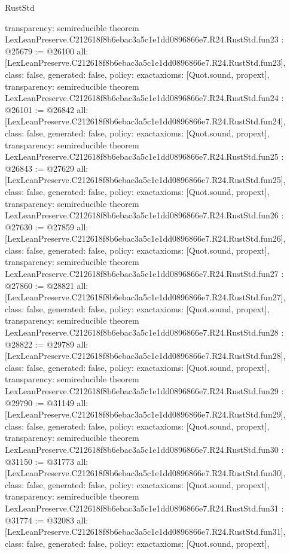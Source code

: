 \begin{lexlean}{RustStd}
\begin{coremodule}
{  transparency: semireducible
}
theorem LexLeanPreserve.C212618f8b6ebac3a5c1e1dd0896866e7.R24.RustStd.fun23 : @25679 := @26100 {
  all: [LexLeanPreserve.C212618f8b6ebac3a5c1e1dd0896866e7.R24.RustStd.fun23],
  class: false,
  generated: false,
  policy: exact{axioms: [Quot.sound, propext]},
  transparency: semireducible
}
theorem LexLeanPreserve.C212618f8b6ebac3a5c1e1dd0896866e7.R24.RustStd.fun24 : @26101 := @26842 {
  all: [LexLeanPreserve.C212618f8b6ebac3a5c1e1dd0896866e7.R24.RustStd.fun24],
  class: false,
  generated: false,
  policy: exact{axioms: [Quot.sound, propext]},
  transparency: semireducible
}
theorem LexLeanPreserve.C212618f8b6ebac3a5c1e1dd0896866e7.R24.RustStd.fun25 : @26843 := @27629 {
  all: [LexLeanPreserve.C212618f8b6ebac3a5c1e1dd0896866e7.R24.RustStd.fun25],
  class: false,
  generated: false,
  policy: exact{axioms: [Quot.sound, propext]},
  transparency: semireducible
}
theorem LexLeanPreserve.C212618f8b6ebac3a5c1e1dd0896866e7.R24.RustStd.fun26 : @27630 := @27859 {
  all: [LexLeanPreserve.C212618f8b6ebac3a5c1e1dd0896866e7.R24.RustStd.fun26],
  class: false,
  generated: false,
  policy: exact{axioms: [Quot.sound, propext]},
  transparency: semireducible
}
theorem LexLeanPreserve.C212618f8b6ebac3a5c1e1dd0896866e7.R24.RustStd.fun27 : @27860 := @28821 {
  all: [LexLeanPreserve.C212618f8b6ebac3a5c1e1dd0896866e7.R24.RustStd.fun27],
  class: false,
  generated: false,
  policy: exact{axioms: [Quot.sound, propext]},
  transparency: semireducible
}
theorem LexLeanPreserve.C212618f8b6ebac3a5c1e1dd0896866e7.R24.RustStd.fun28 : @28822 := @29789 {
  all: [LexLeanPreserve.C212618f8b6ebac3a5c1e1dd0896866e7.R24.RustStd.fun28],
  class: false,
  generated: false,
  policy: exact{axioms: [Quot.sound, propext]},
  transparency: semireducible
}
theorem LexLeanPreserve.C212618f8b6ebac3a5c1e1dd0896866e7.R24.RustStd.fun29 : @29790 := @31149 {
  all: [LexLeanPreserve.C212618f8b6ebac3a5c1e1dd0896866e7.R24.RustStd.fun29],
  class: false,
  generated: false,
  policy: exact{axioms: [Quot.sound, propext]},
  transparency: semireducible
}
theorem LexLeanPreserve.C212618f8b6ebac3a5c1e1dd0896866e7.R24.RustStd.fun30 : @31150 := @31773 {
  all: [LexLeanPreserve.C212618f8b6ebac3a5c1e1dd0896866e7.R24.RustStd.fun30],
  class: false,
  generated: false,
  policy: exact{axioms: [Quot.sound, propext]},
  transparency: semireducible
}
theorem LexLeanPreserve.C212618f8b6ebac3a5c1e1dd0896866e7.R24.RustStd.fun31 : @31774 := @32083 {
  all: [LexLeanPreserve.C212618f8b6ebac3a5c1e1dd0896866e7.R24.RustStd.fun31],
  class: false,
  generated: false,
  policy: exact{axioms: [Quot.sound, propext]},
}
\end{coremodule}
\end{lexlean}
